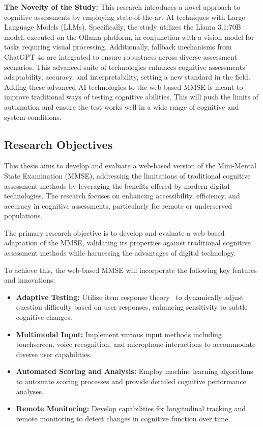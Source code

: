 \noindent\textbf{The Novelty of the Study:} This research introduces a novel approach to cognitive assessments by employing state-of-the-art AI techniques with Large Language Models (LLMs). Specifically, the study utilizes the Llama 3.1:70B model, executed on the Ollama platform, in conjunction with a vision model for tasks requiring visual processing. Additionally, fallback mechanisms from ChatGPT 4o are integrated to ensure robustness across diverse assessment scenarios. This advanced suite of technologies enhances cognitive assessments' adaptability, accuracy, and interpretability, setting a new standard in the field. Adding these advanced AI technologies to the web-based MMSE is meant to improve traditional ways of testing cognitive abilities. This will push the limits of automation and ensure the test works well in a wide range of cognitive and system conditions.

\subsection{Research Objectives}

This thesis aims to develop and evaluate a web-based version of the Mini-Mental State Examination (MMSE), addressing the limitations of traditional cognitive assessment methods by leveraging the benefits offered by modern digital technologies. The research focuses on enhancing accessibility, efficiency, and accuracy in cognitive assessments, particularly for remote or underserved populations.

The primary research objective is to develop and evaluate a web-based adaptation of the MMSE, validating its properties against traditional cognitive assessment methods while harnessing the advantages of digital technology.

To achieve this, the web-based MMSE will incorporate the following key features and innovations:

\begin{itemize}
    \item \textbf{Adaptive Testing:} Utilize item response theory~\cite{embretson2013item} to dynamically adjust question difficulty based on user responses, enhancing sensitivity to subtle cognitive changes.
    
    \item \textbf{Multimodal Input:} Implement various input methods including touchscreen, voice recognition, and microphone interactions to accommodate diverse user capabilities.
    
    \item \textbf{Automated Scoring and Analysis:} Employ machine learning algorithms~\cite{shatte2019machine} to automate scoring processes and provide detailed cognitive performance analyses.
    
    \item \textbf{Remote Monitoring:} Develop capabilities for longitudinal tracking and remote monitoring to detect changes in cognitive function over time.
\end{itemize}

